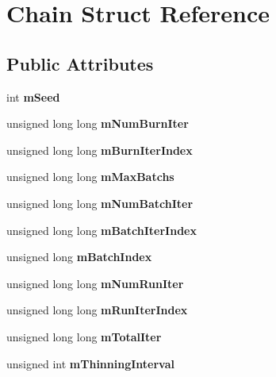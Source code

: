 \hypertarget{struct_chain}{\section{Chain Struct Reference}
\label{struct_chain}
}
\subsection*{Public Attributes}
\begin{DoxyCompactItemize}
\item 
\hypertarget{struct_chain_a544523420d08c87704f0fe3dc858940e}{int {\bfseries m\-Seed}}\label{struct_chain_a544523420d08c87704f0fe3dc858940e}

\item 
\hypertarget{struct_chain_afadc419c50079b4862c15439705a91b3}{unsigned long long {\bfseries m\-Num\-Burn\-Iter}}\label{struct_chain_afadc419c50079b4862c15439705a91b3}

\item 
\hypertarget{struct_chain_a5f2fa4285af044096e42552d7189f4bf}{unsigned long long {\bfseries m\-Burn\-Iter\-Index}}\label{struct_chain_a5f2fa4285af044096e42552d7189f4bf}

\item 
\hypertarget{struct_chain_a6227c11fa5f0d4c1aa1a347ce695efe5}{unsigned long long {\bfseries m\-Max\-Batchs}}\label{struct_chain_a6227c11fa5f0d4c1aa1a347ce695efe5}

\item 
\hypertarget{struct_chain_a67049559e6b25a5a9c54dd7df2cbe159}{unsigned long long {\bfseries m\-Num\-Batch\-Iter}}\label{struct_chain_a67049559e6b25a5a9c54dd7df2cbe159}

\item 
\hypertarget{struct_chain_a4909f34365d2c8619ad3eaa29045804e}{unsigned long long {\bfseries m\-Batch\-Iter\-Index}}\label{struct_chain_a4909f34365d2c8619ad3eaa29045804e}

\item 
\hypertarget{struct_chain_a5ddcbf86f6630ffbfc63021cdf0c288b}{unsigned long {\bfseries m\-Batch\-Index}}\label{struct_chain_a5ddcbf86f6630ffbfc63021cdf0c288b}

\item 
\hypertarget{struct_chain_abb1741a7f5188207422974269ec354ed}{unsigned long long {\bfseries m\-Num\-Run\-Iter}}\label{struct_chain_abb1741a7f5188207422974269ec354ed}

\item 
\hypertarget{struct_chain_a388e9fa9ccacaec5cd3523a843d94ed3}{unsigned long long {\bfseries m\-Run\-Iter\-Index}}\label{struct_chain_a388e9fa9ccacaec5cd3523a843d94ed3}

\item 
\hypertarget{struct_chain_a61b32df317e4194469e29bf503c82bd5}{unsigned long long {\bfseries m\-Total\-Iter}}\label{struct_chain_a61b32df317e4194469e29bf503c82bd5}

\item 
\hypertarget{struct_chain_a670e0b595ea7d5774a3168874384a1ac}{unsigned int {\bfseries m\-Thinning\-Interval}}\label{struct_chain_a670e0b595ea7d5774a3168874384a1ac}

\end{DoxyCompactItemize}



